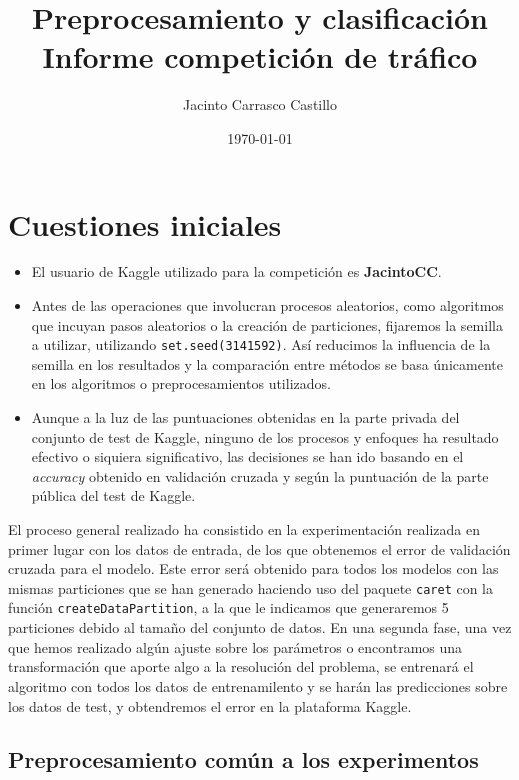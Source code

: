 \documentclass[11pt]{article}
\author{Jacinto Carrasco Castillo}
\date{\today}
\title{Preprocesamiento y clasificación\\\medskip
\large Informe competición de tráfico}
\begin{document}
\maketitle
\tableofcontents


\section{Cuestiones iniciales}
\label{sec:orgad3d2f9}

\begin{itemize}
\item El usuario de Kaggle utilizado para la competición es \textbf{JacintoCC}.
\item Antes de las operaciones que involucran procesos aleatorios, como
algoritmos que incuyan pasos aleatorios o la creación de
particiones, fijaremos la semilla a utilizar, utilizando
\texttt{set.seed(3141592)}. Así reducimos la influencia de la semilla en
los resultados y la comparación entre métodos se basa únicamente en
los algoritmos o preprocesamientos utilizados.
\item Aunque a la luz de las puntuaciones obtenidas en la parte privada
del conjunto de test de Kaggle, ninguno de los procesos y enfoques
ha resultado efectivo o siquiera significativo, las decisiones se
han ido basando en el \emph{accuracy} obtenido en validación cruzada y
según la puntuación de la parte pública del test de Kaggle.
\end{itemize}

El proceso general realizado ha consistido en la experimentación
realizada en primer lugar con los datos de entrada, de los que
obtenemos el error de validación cruzada para el modelo. Este error
será obtenido para todos los modelos con las mismas particiones que se
han generado haciendo uso del paquete \texttt{caret} con la función
\texttt{createDataPartition}, a la que le indicamos que generaremos 5
particiones debido al tamaño del conjunto de datos. En una segunda
fase, una vez que hemos realizado algún ajuste sobre los parámetros o
encontramos una transformación que aporte algo a la resolución del
problema, se entrenará el algoritmo con todos los datos de
entrenamilento y se harán las predicciones sobre los datos de test, y
obtendremos el error en la plataforma Kaggle.

\subsection{Preprocesamiento común a los experimentos}
\label{sec:orgfe94602}
\end{document}
